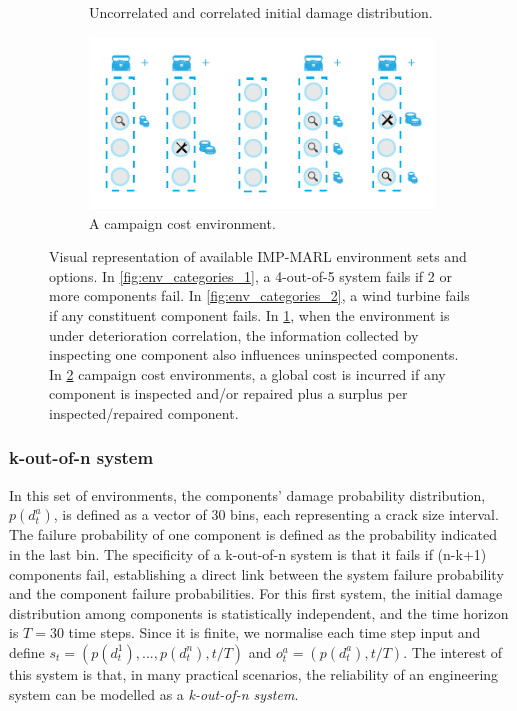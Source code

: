 \begin{figure}
\begin{subfigure}[t]{0.53\textwidth}
    \caption{Uncorrelated and correlated initial damage distribution.}
    \label{fig:env_categories_3}
\end{subfigure}%
\begin{subfigure}[t]{0.47\textwidth}
\centering
    \includegraphics[width=1\linewidth]{tex_thesis/figures/ch5/fig2_mul/environments_v2_d.pdf}
    \caption{A campaign cost environment.}
    \label{fig:env_categories_4}
\end{subfigure}
\caption{
Visual representation of available IMP-MARL environment sets and options.
In \ref{fig:env_categories_1}, a 4-out-of-5 system fails if 2 or more components fail.
In \ref{fig:env_categories_2}, a wind turbine fails if any constituent component fails.
In \ref{fig:env_categories_3}, when the environment is under deterioration correlation, the information collected by inspecting one component also influences uninspected components.
In \ref{fig:env_categories_4} campaign cost environments, a global cost is incurred if any component is inspected and/or repaired plus a surplus per inspected/repaired component. 
}
\label{fig:env_categories}
\end{figure}

\subsubsection{k-out-of-n system}
In this set of environments, the components' damage probability distribution, $p(d^a_t)$, is defined as a vector of 30 bins, each representing a crack size interval.
The failure probability of one component is defined as the probability indicated in the last bin.
The specificity of a k-out-of-n system is that it fails if (n-k+1) components fail, establishing a direct link between the system failure probability and the component failure probabilities.
For this first system, the initial damage distribution among components is statistically independent, and the time horizon is $T=30$ time steps.
Since it is finite, we normalise each time step input and define $s_t = (p(d^1_t),..., p(d^n_t), t/T)$ and $o^a_t=(p(d^a_t), t/T)$.
The interest of this system is that, in many practical scenarios, the reliability of an engineering system can be modelled as a \textit{k-out-of-n system}.

